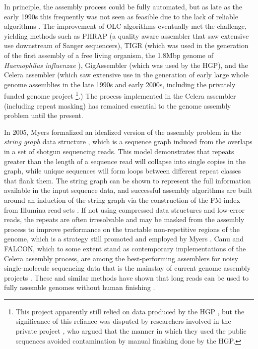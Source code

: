 \documentclass[a4paper,12pt,numbered,oneside]{Classes/PhDThesisPSnPDF}
\begin{document}
In principle, the assembly process could be fully automated, but as late as the early 1990s this frequently was not seen as feasible due to the lack of reliable algorithms \cite{mahy1991sequencing}.
The improvement of OLC algorithms eventually met the challenge, yielding methods such as PHRAP \cite{green1999phrap} (a quality aware assembler that saw extensive use downstream of Sanger sequencers), TIGR \cite{sutton1995tigr} (which was used in the generation of the first assembly of a free living organism, the 1.8Mbp genome of \emph{Haemophilus influenzae} \cite{fleischmann1995whole}), GigAssembler \cite{kent2001assembly} (which was used by the HGP), and the Celera assembler \cite{myers2000whole,miller2008aggressive} (which saw extensive use in the generation of early large whole genome assemblies in the late 1990s and early 2000s, including the privately funded genome project \cite{venter2001sequence}\footnote{This project apparently still relied on data produced by the HGP \cite{waterston2002sequencing}, but the significance of this reliance was disputed by researchers involved in the private project \cite{myers2002sequencing}, who argued that the manner in which they used the public sequences avoided contamination by manual finishing done by the HGP.}.)
The process implemented in the Celera assembler (including repeat masking) has remained essential to the genome assembly problem until the present.

In 2005, Myers formalized an idealized version of the assembly problem in the \emph{string graph} data structure \cite{myers2005fragment}, which is a sequence graph induced from the overlaps in a set of shotgun sequencing reads.
This model demonstrates that repeats greater than the length of a sequence read will collapse into single copies in the graph, while unique sequences will form loops between different repeat classes that flank them.
The string graph can be shown to represent the full information available in the input sequence data, and successful assembly algorithms are built around an induction of the string graph via the construction of the FM-index \cite{ferragina2001experimental} from Illumina read sets \cite{simpson2010,simpson2012efficient,li2015fermikit}.
If not using compressed data structures and low-error reads, the repeats are often irresolvable and may be masked from the assembly process to improve performance on the tractable non-repetitive regions of the genome, which is a strategy still promoted and employed by Myers \cite{myers2014efficient}.
Canu and FALCON, which to some extent stand as contemporary implementations of the Celera assembly process, are among the best-performing assemblers for noisy single-molecule sequencing data that is the mainstay of current genome assembly projects \cite{chin2016phased,koren2017canu}.
These and similar methods have shown that long reads can be used to fully assemble genomes without human finishing \cite{loman2015complete,jain2018nanopore}.
\end{document}

